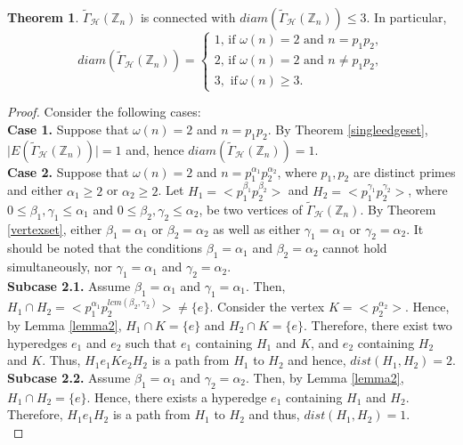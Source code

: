 \documentclass[11pt,a4paper]{article}
\theoremstyle{definition}
\newtheorem{theorem}{Theorem}[section]
\theoremstyle{remark}
\begin{document}
	\begin{theorem}
		$\tilde{\Gamma}_\mathcal{H}(\mathbb{Z}_n)$ is connected with $diam(\tilde{\Gamma}_\mathcal{H}(\mathbb{Z}_n)) \leq 3$. In particular, \\
		 $$diam(\tilde{\Gamma}_\mathcal{H}(\mathbb{Z}_n)) = \begin{cases*}
			1, \, \text{if $\omega(n)=2$ and $n=p_1p_2$},\\
			2, \, \text{if $\omega(n)=2$ and $n \neq p_1p_2$},\\
			3, \,\,  \text{if} \, \omega(n)\geq 3.
		\end{cases*}$$
	\end{theorem}
	\begin{proof}
		Consider the following cases:\\
		\textbf{Case 1.} Suppose that $\omega(n)=2$ and $n=p_1p_2$. By Theorem \ref{singleedgeset}, $\mid E(\tilde{\Gamma}_\mathcal{H}(\mathbb{Z}_n))\mid = 1$ and, hence $diam(\tilde{\Gamma}_\mathcal{H}(\mathbb{Z}_n))=1$.\\
		\textbf{Case 2.} Suppose that $\omega(n)=2$ and $n=p_1^{\alpha_1} p_2^{\alpha_2}$, where $p_1, p_2$ are distinct primes and either $\alpha_1 \geq 2$ or  $\alpha_2 \geq 2$. Let $H_1=<p_1^{\beta_1} p_2^{\beta_2}>$ and $H_2=<p_1^{\gamma_1} p_2^{\gamma_2}>$, where $0 \leq \beta_1,\gamma_1 \leq \alpha_1$ and $0 \leq \beta_2,\gamma_2 \leq \alpha_2$, be two vertices of 	$\tilde{\Gamma}_\mathcal{H}(\mathbb{Z}_n)$. By Theorem \ref{vertexset}, either $\beta_1=\alpha_1$ or $\beta_2=\alpha_2$ as well as either  $\gamma_1=\alpha_1$ or $\gamma_2=\alpha_2$. It should be noted that the conditions $\beta_1=\alpha_1$ and $\beta_2=\alpha_2$ cannot hold simultaneously, nor $\gamma_1=\alpha_1$ and $\gamma_2=\alpha_2$. \\
		\textbf{Subcase 2.1.} Assume  $\beta_1=\alpha_1$ and  $\gamma_1=\alpha_1$. Then, $H_1 \cap H_2 = <p_1^{\alpha_1}p_2^{lcm(\beta_2,\gamma_2)}> \neq \{e\}$.  Consider the vertex $K=<p_2^{\alpha_2}>$. Hence, by Lemma \ref{lemma2}, $H_1 \cap K =\{e\}$ and $H_2 \cap K =\{e\}$. Therefore, there exist two hyperedges $e_1$ and $e_2$ such that $e_1$ containing $H_1$ and $K$, and $e_2$ containing $H_2$ and $K$. Thus, $H_1 e_1 K e_2 H_2$ is a path from $H_1$ to $H_2$ and hence, $dist(H_1,H_2)=2$. \\
			\textbf{Subcase 2.2.} Assume  $\beta_1=\alpha_1$ and  $\gamma_2=\alpha_2$. Then, by Lemma \ref{lemma2}, $H_1 \cap H_2 = \{e\}$. Hence, there exists a hyperedge $e_1$ containing $H_1$ and $H_2$. Therefore, $H_1 e_1 H_2$ is a path from $H_1$ to $H_2$ and thus,  $dist(H_1,H_2)=1$.\\

\end{proof}
\end{document}
